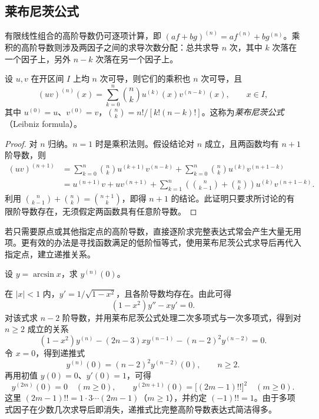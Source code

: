 \subsection{莱布尼茨公式}
\label{subsec:leibniz-formula}

有限线性组合的高阶导数仍可逐项计算，即 $(af+bg)^{(n)}=af^{(n)}+bg^{(n)}$。乘积的高阶导数则涉及两因子之间的求导次数分配：总共求导 $n$ 次，其中 $k$ 次落在一个因子上，另外 $n-k$ 次落在另一个因子上。

\begin{theorem}[莱布尼茨公式]
\label{thm:leibniz-higher-product-rule}
设 $u,v$ 在开区间 $I$ 上均 $n$ 次可导，则它们的乘积也 $n$ 次可导，且
\begin{equation}
\label{eq:leibniz-higher-product-rule}
    (uv)^{(n)}(x)=\sum_{k=0}^n\binom nk
    u^{(k)}(x)v^{(n-k)}(x),\qquad x\in I,
\end{equation}
其中 $u^{(0)}=u$、$v^{(0)}=v$，$\binom nk=n!/[k!(n-k)!]$。这称为\emph{莱布尼茨公式}（Leibniz formula）。
\end{theorem}
\begin{proof}
对 $n$ 归纳。$n=1$ 时是乘积法则。假设结论对 $n$ 成立，且两函数均有 $n+1$ 阶导数，则
\[
\begin{aligned}
    (uv)^{(n+1)}
    &=\sum_{k=0}^n\binom nk u^{(k+1)}v^{(n-k)}
      +\sum_{k=0}^n\binom nk u^{(k)}v^{(n+1-k)}\\
    &=u^{(n+1)}v+uv^{(n+1)}
      +\sum_{k=1}^n
       \left(\binom n{k-1}+\binom nk\right)
       u^{(k)}v^{(n+1-k)}.
\end{aligned}
\]
利用 $\binom n{k-1}+\binom nk=\binom{n+1}k$，即得 $n+1$ 的结论。此证明只要求所讨论的有限阶导数存在，无须假定两函数具有任意阶导数。
\end{proof}

若只需要原点或其他指定点的高阶导数，直接逐阶求完整表达式常会产生大量无用项。更有效的办法是寻找函数满足的低阶恒等式，使用莱布尼茨公式求导后再代入指定点，建立递推关系。

\begin{example}
\label{ex:arcsine-derivative-recurrence-at-zero}
设 $y=\arcsin x$，求 $y^{(n)}(0)$。
\end{example}
\begin{solve}
在 $|x|<1$ 内，$y'=1/\sqrt{1-x^2}$，且各阶导数均存在。由此可得
\[
    (1-x^2)y''-xy'=0.
\]
对该式求 $n-2$ 阶导数，并用莱布尼茨公式处理二次多项式与一次多项式，得到对 $n\geq2$ 成立的关系
\[
    (1-x^2)y^{(n)}-(2n-3)xy^{(n-1)}
    -(n-2)^2y^{(n-2)}=0.
\]
令 $x=0$，得到递推式
\begin{equation}
\label{eq:arcsine-derivatives-zero-recurrence}
    y^{(n)}(0)=(n-2)^2y^{(n-2)}(0),\qquad n\geq2.
\end{equation}
再用初值 $y(0)=0$、$y'(0)=1$，可得
\[
    y^{(2m)}(0)=0\quad(m\geq0),\qquad
    y^{(2m+1)}(0)=\bigl[(2m-1)!!\bigr]^2\quad(m\geq0).
\]
这里 $(2m-1)!!=1\cdot3\cdots(2m-1)$（$m\geq1$），并约定 $(-1)!!=1$。由于多项式因子在少数几次求导后即消失，递推式比完整高阶导数表达式简洁得多。
\end{solve}

